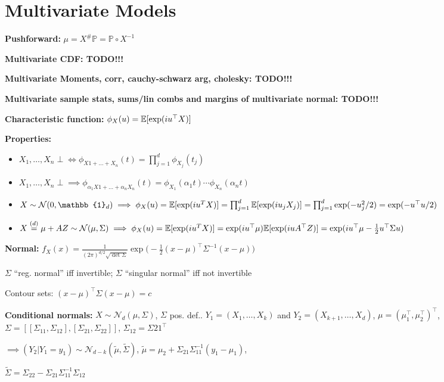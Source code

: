 \section*{Multivariate Models}
\textbf{Pushforward:} $\mu=X^\#\mathbb{P}=\mathbb{P}\circ X^{-1}$

\textbf{Multivariate CDF: TODO!!!}

\textbf{Multivariate Moments, corr, cauchy-schwarz arg, cholesky: TODO!!!}

\textbf{Multivariate sample stats, sums/lin combs and margins of multivariate normal: TODO!!!}

\textbf{Characteristic function:} $\phi_X(u)=\mathbb{E} [\exp(iu^\top X)]$

\textbf{Properties:}
\begin{itemize}
    \item $X_1,\dots,X_n\perp\iff \phi_{X1+\dots+X_n}(t)=\prod^d_{j=1}\phi_{X_j}(t_j)$
    \item $X_1,\dots,X_n\perp\implies \phi_{\alpha_1X1+\dots+\alpha_n X_n}(t)=\phi_{X_1}(\alpha_1 t)\cdots\phi_{X_n}(\alpha_n t)$
    \item $X\sim\mathcal{N}(0,\mathbb{1}_d)\implies \phi_X(u)=\E[\exp(iu^TX)]=\prod^d_{j=1}\E[\exp(i u_j X_j)]=\prod^d_{j=1}\exp(-u^2_j/2 )=\exp(-u^\top u/2)$
    
    \item $X\stackrel{(d)}{=}\mu+AZ\sim\mathcal{N}(\mu,\Sigma)\implies \phi_X(u)=\mathbb{E}[\exp(iu^TX)]=\exp(i u^\top\mu)\mathbb{E}[\exp(i u A^\top Z)] =\exp(i u^\top\mu-\frac{1}{2}u^\top\Sigma u)$
\end{itemize}

\textbf{Normal:} $f_X(x)=\frac{1}{(2\pi)^{d/2}\sqrt{\det\Sigma}}\exp\big(-\frac{1}{2}(x-\mu)^\top\Sigma^{-1}(x-\mu)\big)$

$\Sigma$ ``reg. normal'' iff invertible; $\Sigma$ ``singular normal'' iff not invertible

Contour sets: $(x-\mu)^\top \Sigma(x-\mu)=c$

\textbf{Conditional normals:} $X\sim\mathcal{N}_d(\mu, \Sigma)$, $\Sigma$ pos. def.. $Y_1=(X_1,\dots,X_k)$ and $Y_2=(X_{k+1},\dots,X_d)$, $\mu=(\mu_1^\top,\mu_2^\top)^\top$, $\Sigma=[[\Sigma_{11},\Sigma_{12}],[\Sigma_{21},\Sigma_{22}]]$, $\Sigma_{12}=\Sigma{21}^\top$

$\implies (Y_2|Y_1=y_1)\sim\mathcal{N}_{d-k}(\tilde \mu, \tilde \Sigma)$, $\tilde \mu=\mu_2+\Sigma_{21}\Sigma_{11}^{-1}(y_1-\mu_1)$, 

$\tilde \Sigma=\Sigma_{22}-\Sigma_{21}\Sigma_{11}^{-1}\Sigma_{12}$


